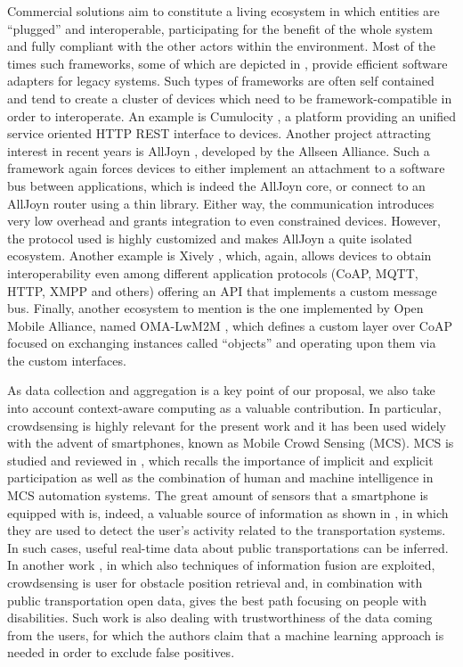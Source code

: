 Commercial solutions aim to constitute a living ecosystem in which entities are ``plugged'' and interoperable, participating for the benefit of the whole system and fully compliant with the other actors within the environment.
Most of the times such frameworks, some of which are depicted in \cite{derhamy2015survey}, provide efficient software adapters for legacy systems.
Such types of frameworks are often self contained and tend to create a cluster of devices which need to be framework-compatible in order to interoperate.
An example is Cumulocity \cite{cumulocity}, a platform providing an unified service oriented HTTP REST interface to devices.
Another project attracting interest in recent years is AllJoyn \cite{alljoyn}, developed by the Allseen Alliance.
Such a framework again forces devices to either implement an attachment to a software bus between applications, which is indeed the AllJoyn core, or connect to an AllJoyn router using a thin library.
Either way, the communication introduces very low overhead and grants integration to even constrained devices.
However, the protocol used is highly customized and makes AllJoyn a quite isolated ecosystem.
Another example is Xively \cite{xively}, which, again, allows devices to obtain interoperability even among different application protocols (CoAP, MQTT, HTTP, XMPP and others) offering an API that implements a custom message bus.
Finally, another ecosystem to mention is the one implemented by Open Mobile Alliance, named OMA-LwM2M \cite{omalwm2m}, which defines a custom layer over CoAP focused on exchanging instances called ``objects'' and operating upon them via the custom interfaces.

As data collection and aggregation is a key point of our proposal, we also take into account context-aware computing as a valuable contribution.
In particular, crowdsensing is highly relevant for the present work and it has been used widely with the advent of smartphones, known as Mobile Crowd Sensing (MCS).
MCS is studied and reviewed in \cite{Guo2014}, which recalls the importance of implicit and explicit participation as well as the combination of human and machine intelligence in MCS automation systems. 
The great amount of sensors that a smartphone is equipped with is, indeed, a valuable source of information as shown in \cite{Bedogni2012}, in which they are used to detect the user's activity related to the transportation systems.
In such cases, useful real-time data about public transportations can be inferred.
In another work \cite{Mirri2014}, in which also techniques of information fusion are exploited, crowdsensing is user for obstacle position retrieval and, in combination with public transportation open data, gives the best path focusing on people with disabilities.
Such work is also dealing with trustworthiness of the data coming from the users, for which the authors claim that a machine learning approach is needed in order to exclude false positives.

